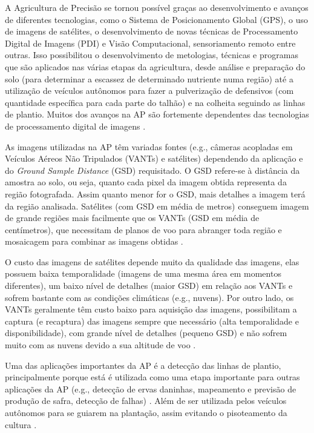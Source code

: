 \documentclass[12pt, a4paper, english, brazil]{article}
\begin{document}
A Agricultura de Precisão se tornou possível graças ao desenvolvimento e avanços de diferentes tecnologias, como o Sistema de Posicionamento Global (GPS), o uso de imagens de satélites, o desenvolvimento de novas técnicas de Processamento Digital de Imagens (PDI) e Visão Computacional, sensoriamento remoto entre outras. Isso possibilitou o desenvolvimento de metologias, técnicas e programas que são aplicados nas várias etapas da agricultura, desde análise e preparação do solo (para determinar a escassez de determinado nutriente numa região) até a utilização de veículos autônomos para fazer a pulverização de defensivos (com quantidade específica para cada parte do talhão) e na colheita seguindo as linhas de plantio. Muitos dos avanços na AP são fortemente dependentes das tecnologias de processamento digital de imagens \cite{Bolfe_2020}.

As imagens utilizadas na AP têm variadas fontes (e.g., câmeras acopladas em Veículos Aéreos Não Tripulados (VANTs) e satélites) dependendo da aplicação e do \textit{Ground Sample Distance} (GSD) requisitado. O GSD refere-se à distância da amostra ao solo, ou seja, quanto cada pixel da imagem obtida representa da região fotografada. Assim quanto menor for o GSD, mais detalhes a imagem terá da região analisada. Satélites (com GSD em média de metros) conseguem imagem de grande regiões mais facilmente que os VANTs (GSD em média de centímetros), que necessitam de planos de voo para abranger toda região e mosaicagem para combinar as imagens obtidas \cite{Messina_2020}.

O custo das imagens de satélites depende muito da qualidade das imagens, elas possuem baixa temporalidade (imagens de uma mesma área em momentos diferentes), um baixo nível de detalhes (maior GSD) em relação aos VANTs e sofrem bastante com as condições climáticas (e.g., nuvens). Por outro lado, os VANTs geralmente têm custo baixo para aquisição das imagens, possibilitam a captura (e recaptura) das imagens sempre que necessário (alta temporalidade e disponibilidade), com grande nível de detalhes (pequeno GSD) e não sofrem muito com as nuvens devido a sua altitude de voo \cite{Candiago_2015, Delavarpour_2021}.

Uma das aplicações importantes da AP é a detecção das linhas de plantio, principalmente porque está é utilizada como uma etapa importante para outras aplicações da AP (e.g., detecção de ervas daninhas, mapeamento e previsão de produção de safra, detecção de falhas) \cite{Hassanein_2019}. Além de ser utilizada pelos veículos autônomos para se guiarem na plantação, assim evitando o pisoteamento da cultura \cite{Doha_2021}.
\end{document}
